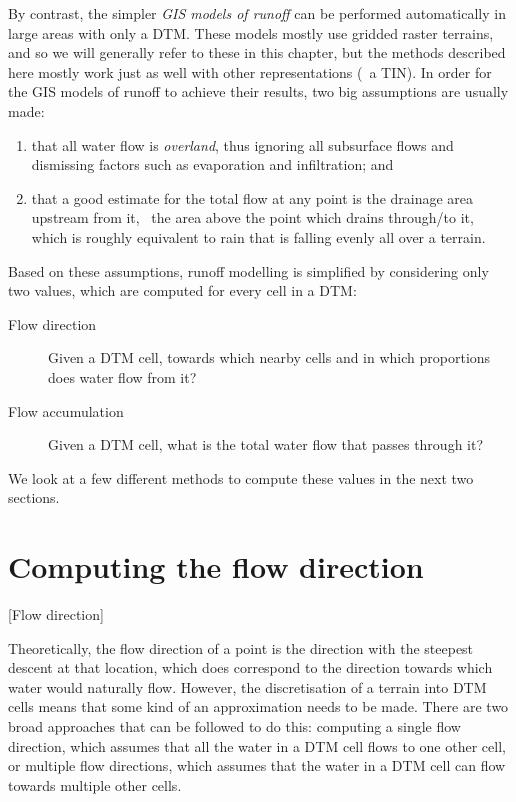 By contrast, the simpler \emph{GIS models of runoff} can be performed automatically in large areas with only a DTM\@.
These models mostly use gridded raster terrains, and so we will generally refer to these in this chapter, but the methods described here mostly work just as well with other representations (\eg\ a TIN).
In order for the GIS models of runoff to achieve their results, two big assumptions are usually made:

\begin{enumerate}
\item that all water flow is \emph{overland}, thus ignoring all subsurface flows and dismissing factors such as evaporation and infiltration; and
\item that a good estimate for the total flow at any point is the drainage area upstream from it, \ie\ the area above the point which drains through/to it, which is roughly equivalent to rain that is falling evenly all over a terrain.
\end{enumerate}

Based on these assumptions, runoff modelling is simplified by considering only two values, which are computed for every cell in a DTM\@:

\begin{description}
\item[Flow direction]
Given a DTM cell, towards which nearby cells and in which proportions does water flow from it?
\item[Flow accumulation]
Given a DTM cell, what is the total water flow that passes through it?
\end{description}

We look at a few different methods to compute these values in the next two sections.

\section{Computing the flow direction}[Flow direction]%
\label{se:direction}

Theoretically, the flow direction of a point is the direction with the steepest descent at that location, which does correspond to the direction towards which water would naturally flow.
However, the discretisation of a terrain into DTM cells means that some kind of an approximation needs to be made.
There are two broad approaches that can be followed to do this: computing a single flow direction, which assumes that all the water in a DTM cell flows to one other cell, or multiple flow directions, which assumes that the water in a DTM cell can flow towards multiple other cells.


